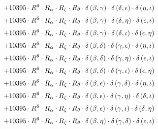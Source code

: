 \begin{subequations}
\begin{gather}
 \\[0.2em] \notag 		 + 10395 \cdot R^{6} \cdot R_{\alpha{}} \cdot R_{\zeta{}} \cdot R_{\theta{}} \cdot \delta{}\left(\beta{}, \gamma{}\right) \cdot \delta{}\left(\delta{}, \epsilon{}\right) \cdot \delta{}\left(\eta{}, \iota{}\right) 
 \\[0.2em] \notag 		 + 10395 \cdot R^{6} \cdot R_{\alpha{}} \cdot R_{\zeta{}} \cdot R_{\theta{}} \cdot \delta{}\left(\beta{}, \gamma{}\right) \cdot \delta{}\left(\delta{}, \eta{}\right) \cdot \delta{}\left(\epsilon{}, \iota{}\right) 
 \\[0.2em] \notag 		 + 10395 \cdot R^{6} \cdot R_{\alpha{}} \cdot R_{\zeta{}} \cdot R_{\theta{}} \cdot \delta{}\left(\beta{}, \gamma{}\right) \cdot \delta{}\left(\delta{}, \iota{}\right) \cdot \delta{}\left(\epsilon{}, \eta{}\right) 
 \\[0.2em] \notag 		 + 10395 \cdot R^{6} \cdot R_{\alpha{}} \cdot R_{\zeta{}} \cdot R_{\theta{}} \cdot \delta{}\left(\beta{}, \delta{}\right) \cdot \delta{}\left(\gamma{}, \epsilon{}\right) \cdot \delta{}\left(\eta{}, \iota{}\right) 
 \\[0.2em] \notag 		 + 10395 \cdot R^{6} \cdot R_{\alpha{}} \cdot R_{\zeta{}} \cdot R_{\theta{}} \cdot \delta{}\left(\beta{}, \delta{}\right) \cdot \delta{}\left(\gamma{}, \eta{}\right) \cdot \delta{}\left(\epsilon{}, \iota{}\right) 
 \\[0.2em] \notag 		 + 10395 \cdot R^{6} \cdot R_{\alpha{}} \cdot R_{\zeta{}} \cdot R_{\theta{}} \cdot \delta{}\left(\beta{}, \delta{}\right) \cdot \delta{}\left(\gamma{}, \iota{}\right) \cdot \delta{}\left(\epsilon{}, \eta{}\right) 
 \\[0.2em] \notag 		 + 10395 \cdot R^{6} \cdot R_{\alpha{}} \cdot R_{\zeta{}} \cdot R_{\theta{}} \cdot \delta{}\left(\beta{}, \epsilon{}\right) \cdot \delta{}\left(\gamma{}, \delta{}\right) \cdot \delta{}\left(\eta{}, \iota{}\right) 
 \\[0.2em] \notag 		 + 10395 \cdot R^{6} \cdot R_{\alpha{}} \cdot R_{\zeta{}} \cdot R_{\theta{}} \cdot \delta{}\left(\beta{}, \epsilon{}\right) \cdot \delta{}\left(\gamma{}, \eta{}\right) \cdot \delta{}\left(\delta{}, \iota{}\right) 
 \\[0.2em] \notag 		 + 10395 \cdot R^{6} \cdot R_{\alpha{}} \cdot R_{\zeta{}} \cdot R_{\theta{}} \cdot \delta{}\left(\beta{}, \epsilon{}\right) \cdot \delta{}\left(\gamma{}, \iota{}\right) \cdot \delta{}\left(\delta{}, \eta{}\right) 
 \\[0.2em] \notag 		 + 10395 \cdot R^{6} \cdot R_{\alpha{}} \cdot R_{\zeta{}} \cdot R_{\theta{}} \cdot \delta{}\left(\beta{}, \eta{}\right) \cdot \delta{}\left(\gamma{}, \delta{}\right) \cdot \delta{}\left(\epsilon{}, \iota{}\right) 

\end{gather}
\end{subequations}
